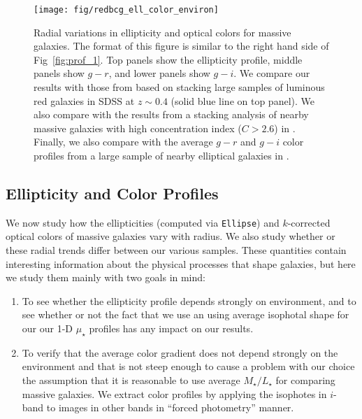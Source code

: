 \documentclass[a4paper,fleqn,usenatbib]{mnras}
\def\m2l{{$M_{\star}/L_{\star}$}}
\def\mden{{$\mu_{\star}$}}
\begin{document}
  \begin{figure}
      \centering 
      \texttt{[image: fig/redbcg\_ell\_color\_environ]}
      \caption{
          Radial variations in ellipticity and optical colors for massive galaxies. 
          The format of this figure is similar to the right hand side of 
          Fig~\ref{fig:prof_1}. 
          Top panels show the ellipticity profile, middle panels show $g-r$, and lower 
          panels show $g-i$. 
          We compare our results with those from \citet{Tal2011} based on stacking 
          large samples of luminous red galaxies in SDSS at $z{\sim} 0.4$ 
          (solid blue line on top panel). 
          We also compare with the results from a stacking analysis of nearby massive 
          galaxies with high concentration index ($C>2.6$) in 
          \citet[][blue dash lines on the top and middle panels]{DSouza2014}. 
          Finally, we also compare with the average $g-r$ and $g-i$ color profiles 
          from a large sample of nearby elliptical galaxies in \citet[][blue, solid 
          lines on the middle and bottom panels]{LaBarbera2010}.
          }
      \label{fig:ell_color}
  \end{figure}


\subsection{Ellipticity and Color Profiles}
    \label{ssec:ell_color}

    We now study how the ellipticities (computed via \texttt{Ellipse}) and $k$-corrected 
    optical colors of massive galaxies vary with radius. 
    We also study whether or these radial trends differ between our various samples. 
    These quantities contain interesting information about the physical processes that 
    shape galaxies, but here we study them mainly with two goals in mind:
       
    \begin{enumerate}
        
        \item To see whether the ellipticity profile depends strongly on environment, 
            and to see whether or not the fact that we use an using average isophotal 
            shape for our our 1-D \mden{} profiles has any impact on our results.
        
        \item To verify that the average color gradient does not depend strongly on 
            the environment and that is not steep enough to cause a problem with our 
            choice the assumption that it is reasonable to use average \m2l for 
            comparing massive galaxies. 
            We extract color profiles by applying the isophotes in $i$-band to images 
            in other bands in ``forced photometry'' manner.  
            
    \end{enumerate}
\end{document}
